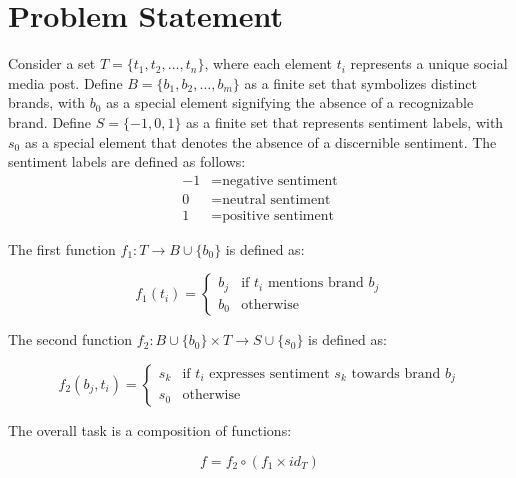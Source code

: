 \documentclass{article}
\begin{document}
\section{Problem Statement}

Consider a set $T = \{t_1, t_2, \ldots, t_n\}$, where each element $t_i$
represents a unique social media post. Define $B = \{b_1, b_2, \ldots, b_m\}$
as a finite set that symbolizes distinct brands, with $b_0$ as a special
element signifying the absence of a recognizable brand. Define $S = \{-1, 0,
    1\}$ as a finite set that represents sentiment labels, with $s_0$ as a special
element that denotes the absence of a discernible sentiment. The sentiment
labels are defined as follows:
\begin{align*}
    -1 & = \text{negative sentiment} \\
    0  & = \text{neutral sentiment}  \\
    1  & = \text{positive sentiment}
\end{align*}

The first function $f_1: T \rightarrow B \cup \{b_0\}$ is defined as:

\[
    f_1(t_i) =
    \begin{cases}
        b_j & \text{if } t_i \text{ mentions brand } b_j \\
        b_0 & \text{otherwise}
    \end{cases}
\]

The second function $f_2: B \cup \{b_0\} \times T \rightarrow S \cup \{s_0\}$
is defined as:

\[
    f_2(b_j, t_i) =
    \begin{cases}
        s_k & \text{if } t_i \text{ expresses sentiment } s_k \text{ towards
        brand } b_j                                                          \\
        s_0 & \text{otherwise}
    \end{cases}
\]

The overall task is a composition of functions:

\[
    f = f_2 \circ (f_1 \times id_T)
\]
\end{document}
